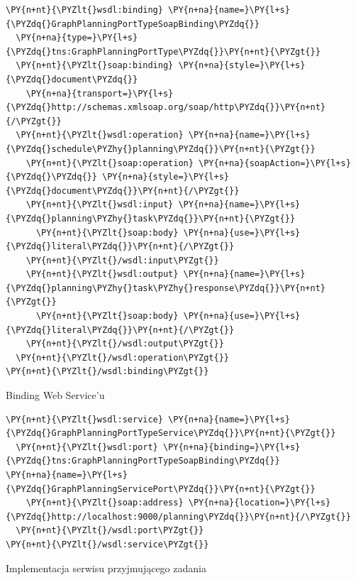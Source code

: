 \begin{program}
\begin{code}
\begin{Verbatim}[commandchars=\\\{\}]
\PY{n+nt}{\PYZlt{}wsdl:binding} \PY{n+na}{name=}\PY{l+s}{\PYZdq{}GraphPlanningPortTypeSoapBinding\PYZdq{}} 
  \PY{n+na}{type=}\PY{l+s}{\PYZdq{}tns:GraphPlanningPortType\PYZdq{}}\PY{n+nt}{\PYZgt{}}
  \PY{n+nt}{\PYZlt{}soap:binding} \PY{n+na}{style=}\PY{l+s}{\PYZdq{}document\PYZdq{}} 
    \PY{n+na}{transport=}\PY{l+s}{\PYZdq{}http://schemas.xmlsoap.org/soap/http\PYZdq{}}\PY{n+nt}{/\PYZgt{}}
  \PY{n+nt}{\PYZlt{}wsdl:operation} \PY{n+na}{name=}\PY{l+s}{\PYZdq{}schedule\PYZhy{}planning\PYZdq{}}\PY{n+nt}{\PYZgt{}}
    \PY{n+nt}{\PYZlt{}soap:operation} \PY{n+na}{soapAction=}\PY{l+s}{\PYZdq{}\PYZdq{}} \PY{n+na}{style=}\PY{l+s}{\PYZdq{}document\PYZdq{}}\PY{n+nt}{/\PYZgt{}}
    \PY{n+nt}{\PYZlt{}wsdl:input} \PY{n+na}{name=}\PY{l+s}{\PYZdq{}planning\PYZhy{}task\PYZdq{}}\PY{n+nt}{\PYZgt{}}
      \PY{n+nt}{\PYZlt{}soap:body} \PY{n+na}{use=}\PY{l+s}{\PYZdq{}literal\PYZdq{}}\PY{n+nt}{/\PYZgt{}}
    \PY{n+nt}{\PYZlt{}/wsdl:input\PYZgt{}}
    \PY{n+nt}{\PYZlt{}wsdl:output} \PY{n+na}{name=}\PY{l+s}{\PYZdq{}planning\PYZhy{}task\PYZhy{}response\PYZdq{}}\PY{n+nt}{\PYZgt{}}
      \PY{n+nt}{\PYZlt{}soap:body} \PY{n+na}{use=}\PY{l+s}{\PYZdq{}literal\PYZdq{}}\PY{n+nt}{/\PYZgt{}}
    \PY{n+nt}{\PYZlt{}/wsdl:output\PYZgt{}}
  \PY{n+nt}{\PYZlt{}/wsdl:operation\PYZgt{}}
\PY{n+nt}{\PYZlt{}/wsdl:binding\PYZgt{}}
\end{Verbatim}
\end{code}
\caption{Binding Web Service'u}
\end{program}



\begin{program}
\begin{code}
\begin{Verbatim}[commandchars=\\\{\}]
\PY{n+nt}{\PYZlt{}wsdl:service} \PY{n+na}{name=}\PY{l+s}{\PYZdq{}GraphPlanningPortTypeService\PYZdq{}}\PY{n+nt}{\PYZgt{}}
  \PY{n+nt}{\PYZlt{}wsdl:port} \PY{n+na}{binding=}\PY{l+s}{\PYZdq{}tns:GraphPlanningPortTypeSoapBinding\PYZdq{}}
\PY{n+na}{name=}\PY{l+s}{\PYZdq{}GraphPlanningServicePort\PYZdq{}}\PY{n+nt}{\PYZgt{}}
    \PY{n+nt}{\PYZlt{}soap:address} \PY{n+na}{location=}\PY{l+s}{\PYZdq{}http://localhost:9000/planning\PYZdq{}}\PY{n+nt}{/\PYZgt{}}
  \PY{n+nt}{\PYZlt{}/wsdl:port\PYZgt{}}
\PY{n+nt}{\PYZlt{}/wsdl:service\PYZgt{}}
\end{Verbatim}
\end{code}
\caption{Implementacja serwisu przyjmującego zadania}
\end{program}


